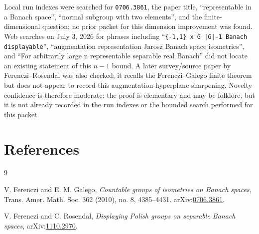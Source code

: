 \documentclass[11pt]{article}
\begin{document}
Local run indexes were searched for \texttt{0706.3861}, the paper title,
``representable in a Banach space'', ``normal subgroup with two elements'',
and the finite-dimensional question; no prior packet for this dimension
improvement was found.  Web searches on July 3, 2026 for phrases including
``\texttt{\{-1,1\} x G |G|-1 Banach displayable}'',
``augmentation representation Jarosz Banach space isometries'', and
``For arbitrarily large n representable separable real Banach'' did not
locate an existing statement of this $n-1$ bound.  A later survey/source
paper by Ferenczi--Rosendal \cite{FR} was also checked; it recalls the
Ferenczi--Galego finite theorem but does not appear to record this
augmentation-hyperplane sharpening.  Novelty confidence is therefore
moderate: the proof is elementary and may be folklore, but it is not already
recorded in the run indexes or the bounded search performed for this packet.

\section*{References}

\begin{thebibliography}{9}

V. Ferenczi and E. M. Galego,
\emph{Countable groups of isometries on Banach spaces},
Trans. Amer. Math. Soc. 362 (2010), no. 8, 4385--4431.
arXiv:\href{https://arxiv.org/abs/0706.3861}{0706.3861}.

V. Ferenczi and C. Rosendal,
\emph{Displaying Polish groups on separable Banach spaces},
arXiv:\href{https://arxiv.org/abs/1110.2970}{1110.2970}.

\end{thebibliography}
\end{document}
